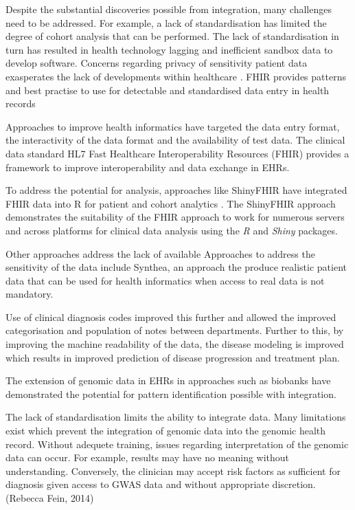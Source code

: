 \documentclass{bioinfo}
\begin{document}
Despite the substantial discoveries possible from integration, many challenges need to be addressed. For example, a lack of standardisation has limited the degree of cohort analysis that can be performed. 
The lack of standardisation in turn has resulted in health technology lagging \citep{Evans2016} and inefficient sandbox data to develop software.
Concerns regarding privacy of sensitivity patient data exasperates the lack of developments within healthcare \cite{Ross2014}. FHIR provides patterns and best practise to use for detectable and standardised data entry in health records \

Approaches to improve health informatics have targeted the data entry format, the interactivity of the data format and the availability of test data. The clinical data standard HL7 Fast Healthcare Interoperability Resources (FHIR) \cite{Hong2017} provides a framework to improve interoperability and data exchange in EHRs.  

To address the potential for analysis, approaches like ShinyFHIR have integrated FHIR data into R for patient and cohort analytics \cite{Hong2017}. 
The ShinyFHIR approach demonstrates the suitability of the FHIR approach to work for numerous servers and across platforms for clinical data analysis using the \textit{R} and \textit{Shiny} packages.


Other approaches address the lack of available 
Approaches to address the sensitivity of the data include Synthea, an approach the produce realistic patient data that can be used for health informatics when access to real data is not mandatory. 

Use of clinical diagnosis codes improved this further and allowed the improved categorisation and population of notes between departments. Further to this, by improving the machine readability of the data, the disease modeling is improved which results in improved prediction of disease progression and treatment plan. 

The extension of genomic data in EHRs in approaches such as biobanks have demonstrated the potential for pattern identification possible with integration. 

The lack of standardisation limits the ability to integrate data. Many limitations exist which prevent the integration of genomic data into the genomic health record. Without adequete training, issues regarding interpretation of the genomic data can occur. For example, results may have no meaning without understanding. Conversely, the clinician may accept risk factors as sufficient for diagnosis given access to GWAS data and without appropriate discretion. (Rebecca Fein, 2014) 
\end{document}
